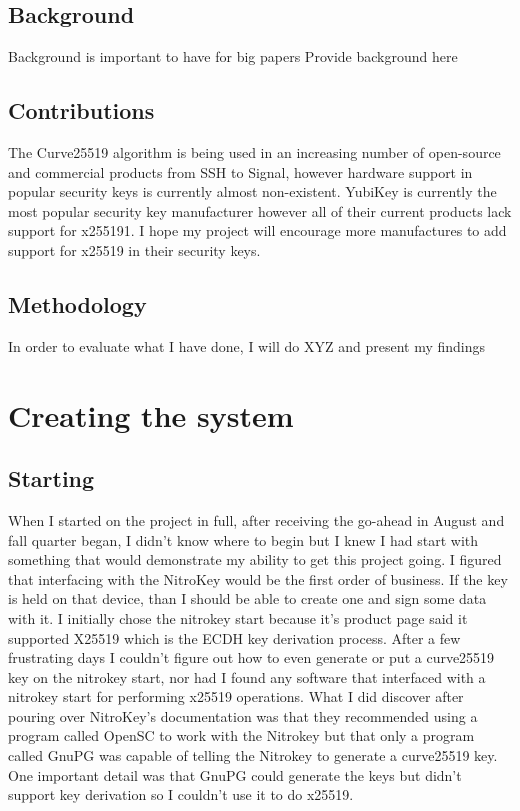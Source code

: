 \documentclass [11pt, proquest] {uwthesis}[2020/02/24]
\begin{document}
\section {Background}
Background is important to have for big papers
Provide background here

\section {Contributions}
The Curve25519 algorithm is being used in an increasing number of open-source and commercial products\cite{noauthor_things_nodate-1} from SSH to Signal, however hardware support in popular 
security keys is currently almost non-existent. YubiKey is currently the most popular security key manufacturer however all of their current products 
lack support for x255191. I hope my project will encourage more manufactures to add support for x25519 in their security keys.


\section {Methodology}
In order to evaluate what I have done, I will do XYZ and present my findings

\chapter {Creating the system}

\section {Starting}
When I started on the project in full, after receiving the go-ahead in August and fall quarter began, I didn't know where to begin but I knew I had start with something that would demonstrate my ability to get this project going.
I figured that interfacing with the NitroKey would be the first order of business. If the key is held on that device, than I should be able to create one and sign some data with it. I initially chose the nitrokey start because it's product page said it supported X25519\cite{noauthor_nitrokey_nodate} which is the ECDH key derivation process. After a few frustrating days I couldn't figure out how to even generate or put a curve25519 key on the nitrokey start, nor had I found any software that interfaced with a nitrokey start for performing x25519 operations. What I did discover after pouring over NitroKey's documentation was that they recommended using a program called OpenSC to work with the Nitrokey but that only a program called GnuPG was capable of telling the Nitrokey to generate a curve25519 key. One important detail was that GnuPG could generate the keys but didn't support key derivation so I couldn't use it to do x25519.
\end{document}
